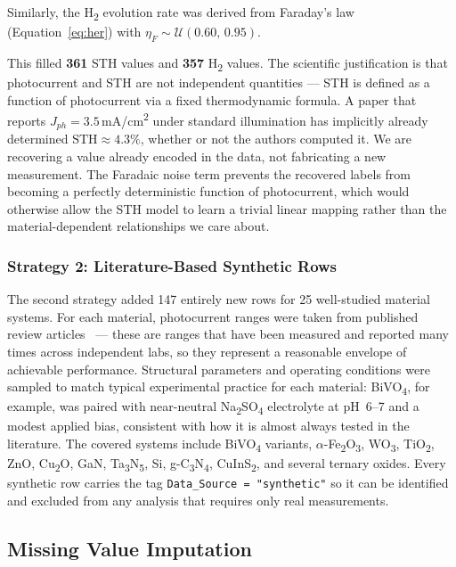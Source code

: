 Similarly, the H\textsubscript{2} evolution rate was derived from Faraday's law
(Equation~\eqref{eq:her}) with $\eta_F \sim \mathcal{U}(0.60,\,0.95)$.

This filled \textbf{361} STH values and \textbf{357} H\textsubscript{2} values.
The scientific justification is that photocurrent and STH are not independent
quantities --- STH is defined as a function of photocurrent via a fixed
thermodynamic formula.
A paper that reports $J_{ph} = 3.5$\,mA/cm\textsuperscript{2} under standard
illumination has implicitly already determined $\mathrm{STH} \approx 4.3\%$,
whether or not the authors computed it.
We are recovering a value already encoded in the data, not fabricating a new
measurement.
The Faradaic noise term prevents the recovered labels from becoming a perfectly
deterministic function of photocurrent, which would otherwise allow the STH model
to learn a trivial linear mapping rather than the material-dependent relationships
we care about.

\subsubsection{Strategy 2: Literature-Based Synthetic Rows}

The second strategy added 147 entirely new rows for 25 well-studied material systems.
For each material, photocurrent ranges were taken from published review
articles~\cite{dias2016recent,tamirat2016using} --- these are ranges that have
been measured and reported many times across independent labs, so they represent
a reasonable envelope of achievable performance.
Structural parameters and operating conditions were sampled to match typical
experimental practice for each material: BiVO\textsubscript{4}, for example,
was paired with near-neutral Na\textsubscript{2}SO\textsubscript{4} electrolyte
at pH~6--7 and a modest applied bias, consistent with how it is almost always
tested in the literature.
The covered systems include BiVO\textsubscript{4} variants,
$\alpha$-Fe\textsubscript{2}O\textsubscript{3}, WO\textsubscript{3},
TiO\textsubscript{2}, ZnO, Cu\textsubscript{2}O, GaN,
Ta\textsubscript{3}N\textsubscript{5}, Si, g-C\textsubscript{3}N\textsubscript{4},
CuInS\textsubscript{2}, and several ternary oxides.
Every synthetic row carries the tag \texttt{Data\_Source = "synthetic"} so it
can be identified and excluded from any analysis that requires only real measurements.

\subsection{Missing Value Imputation}

